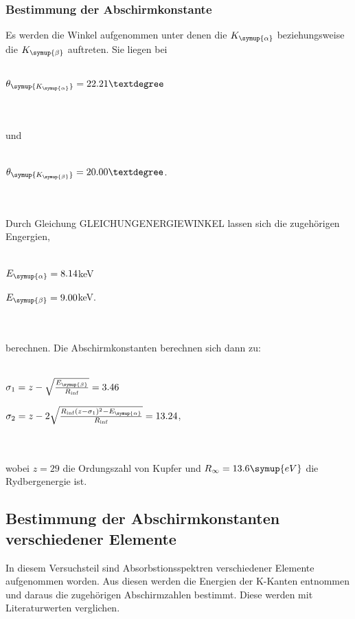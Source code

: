     \subsubsection{Bestimmung der Abschirmkonstante}
        Es werden die Winkel aufgenommen unter denen die $K_{\symup{\alpha}}$ beziehungsweise die $K_{\symup{\beta}}$ auftreten.
        Sie liegen bei
        \\ \\
        \centerline{$\theta_{\symup{K_{\symup{\alpha}}}} = 22.21°$}
        \\ \\
        und 
        \\ \\
        \centerline{$\theta_{\symup{K_{\symup{\beta}}}} = 20.00°$.}
        \\ \\
        Durch Gleichung GLEICHUNGENERGIEWINKEL lassen sich die zugehörigen Engergien, 
        \\ \\
        \centerline{$E_{\symup{\alpha}} = 8.14 $keV}
        \centerline{$E_{\symup{\beta}} = 9.00 $keV.}
        \\ \\
        berechnen.
        Die Abschirmkonstanten berechnen sich dann zu:
        \\ \\
        \centerline{$\sigma_1 = z - \sqrt{\frac{E_{\symup{\beta}}}{R_{\inf}} } = 3.46 $}
        \centerline{$\sigma_2 = z - 2 \sqrt{\frac{R_{\inf}(z - \sigma_1)^2 - E_{\symup{\alpha}}}{R_{\inf}}} = 13.24 $,}
        \\ \\
        wobei $z = 29$ die Ordungszahl von Kupfer und $R_{\infty} = 13.6 \symup{eV}$ die Rydbergenergie ist.
\subsection{Bestimmung der Abschirmkonstanten verschiedener Elemente} 
\label{sec:bah}
    In diesem Versuchsteil sind Absorbstionsspektren verschiedener Elemente aufgenommen worden. Aus diesen werden die Energien der 
    K-Kanten entnommen und daraus die zugehörigen Abschirmzahlen bestimmt. Diese werden mit Literaturwerten verglichen.
        
